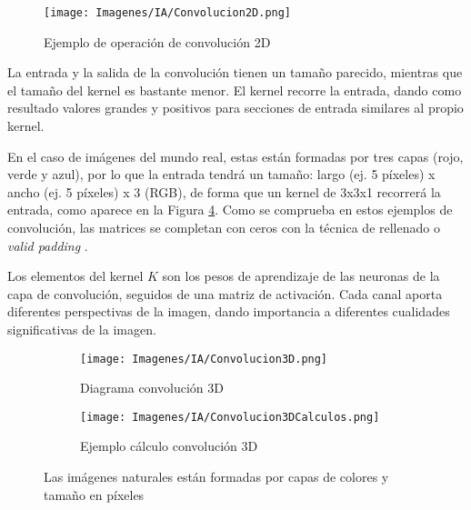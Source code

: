 \documentclass{report}
\begin{document}
\vspace{0.4cm}
\begin{figure}[H]
    \centering
    \texttt{[image: Imagenes/IA/Convolucion2D.png]}
    \caption{Ejemplo de operación de convolución 2D \cite{EzequielCNN}}
    \label{fig:Convolucion}
\end{figure}
\vspace{0.4cm}



La entrada y la salida de la convolución tienen un tamaño parecido, mientras que el tamaño del kernel es bastante menor. El kernel recorre la entrada, dando como resultado valores grandes y positivos para secciones de entrada similares al propio kernel.

En el caso de imágenes del mundo real, estas están formadas por tres capas (rojo, verde y azul), por lo que la entrada tendrá un tamaño: largo (ej. 5 píxeles) x ancho (ej. 5 píxeles) x 3 (RGB), de forma que un kernel de 3x3x1 recorrerá la entrada, como aparece en la Figura \ref{fig:CalculosConvolucion}. Como se comprueba en estos ejemplos de convolución, las matrices se completan con ceros con la técnica de rellenado o \textit{valid padding} \cite{BuenArticuloConvolucion}.

Los elementos del kernel $K$ son los pesos de aprendizaje de las neuronas de la capa de convolución, seguidos de una matriz de activación. Cada canal aporta diferentes perspectivas de la imagen, dando importancia a diferentes cualidades significativas de la imagen.


\vspace{0.4cm}
\begin{figure}[hbpt]
	 	\centering
	 	\begin{subfigure}[b]{0.2\linewidth}
	 	\centering
	 		\texttt{[image: Imagenes/IA/Convolucion3D.png]}
                    \caption{ Diagrama convolución 3D  }
                    \label{fig:Convolucion3D}
	 	\end{subfigure}
	 	\centering
	 	\begin{subfigure}[b]{0.7\linewidth}
	 	\centering
	 		\texttt{[image: Imagenes/IA/Convolucion3DCalculos.png]}
                    \caption{ Ejemplo cálculo convolución 3D }
                    \label{fig:Convolucion3DCalculos}
	 	\end{subfigure}
	 	\caption{ Las imágenes naturales están formadas por capas de colores y tamaño en píxeles  \cite{BuenArticuloConvolucion} } 
	 	\label{fig:CalculosConvolucion}
\end{figure}
\end{document}
